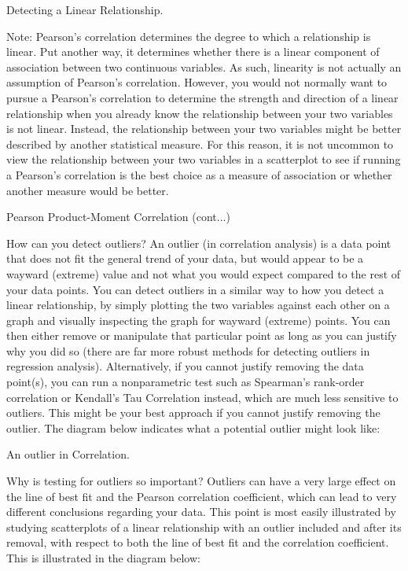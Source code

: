 \documentclass[]{article}
\begin{document}
Detecting a Linear Relationship. 

Note: Pearson's correlation determines the degree to which a relationship is linear. Put another way, it determines whether there is a linear component of association between two continuous variables. As such, linearity is not actually an assumption of Pearson's correlation. However, you would not normally want to pursue a Pearson's correlation to determine the strength and direction of a linear relationship when you already know the relationship between your two variables is not linear. Instead, the relationship between your two variables might be better described by another statistical measure. For this reason, it is not uncommon to view the relationship between your two variables in a scatterplot to see if running a Pearson's correlation is the best choice as a measure of association or whether another measure would be better.

Pearson Product-Moment Correlation (cont...)

How can you detect outliers?
An outlier (in correlation analysis) is a data point that does not fit the general trend of your data, but would appear to be a wayward (extreme) value and not what you would expect compared to the rest of your data points. You can detect outliers in a similar way to how you detect a linear relationship, by simply plotting the two variables against each other on a graph and visually inspecting the graph for wayward (extreme) points. You can then either remove or manipulate that particular point as long as you can justify why you did so (there are far more robust methods for detecting outliers in regression analysis). Alternatively, if you cannot justify removing the data point(s), you can run a nonparametric test such as Spearman's rank-order correlation or Kendall's Tau Correlation instead, which are much less sensitive to outliers. This might be your best approach if you cannot justify removing the outlier. The diagram below indicates what a potential outlier might look like:

An outlier in Correlation. 

Why is testing for outliers so important?
Outliers can have a very large effect on the line of best fit and the Pearson correlation coefficient, which can lead to very different conclusions regarding your data. This point is most easily illustrated by studying scatterplots of a linear relationship with an outlier included and after its removal, with respect to both the line of best fit and the correlation coefficient. This is illustrated in the diagram below:
\end{document}
